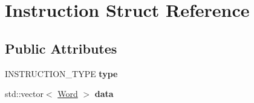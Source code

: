 \hypertarget{structInstruction}{
\section{Instruction Struct Reference}
\label{structInstruction}
}
\subsection*{Public Attributes}
\begin{DoxyCompactItemize}
\item 
\hypertarget{structInstruction_afc9f26527635d9d851759eab142e5ec7}{
INSTRUCTION\_\-TYPE {\bfseries type}}
\label{structInstruction_afc9f26527635d9d851759eab142e5ec7}

\item 
\hypertarget{structInstruction_a93f6b7366b14b17d8379ea952687960c}{
std::vector$<$ \hyperlink{classWord}{Word} $>$ {\bfseries data}}
\label{structInstruction_a93f6b7366b14b17d8379ea952687960c}

\end{DoxyCompactItemize}
